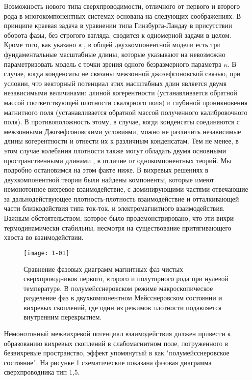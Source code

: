 Возможность нового типа сверхпроводимости, отличного от первого и второго рода 
в многокомпонентных системах \cite{bib:1,bib:2} основана на следующих 
соображениях. В принципе краевая задача в уравнении типа Гинзбурга-Ландау в 
присутствии оборота фазы, без строгого взгляда, сводится к одномерной задачи 
в целом. Кроме того, как указано в \cite{bib:1,bib:2}, в общей 
двухкомпонентной модели есть три фундаментальные масштабные длины, которые 
указывают на невозможно параметризовать модель с точки зрения одного 
безразмерного параметра \( \kappa \). В случае, когда конденсаты не связаны 
межзонной джозефсоновской связью, при условии, что векторный потенциал этих
масштабных длин является двумя независимыми величинами: длиной когерентности 
(устанавливается обратной массой соответствующей плотности скалярного поля) и 
глубиной проникновения магнитного поля (устанавливается обратной массой 
полученного калибровочного поля). В противоположность этому, в случае, когда 
конденсаты соединяются с межзонными Джозефсоновскими условиями, можно не 
различить независимые длины когерентности и отнести их к различным 
конденсатам. Тем не менее, в этом случае колебания плотности также могут 
обладать двумя основными пространственными длинами \cite{bib:2}, в отличие от 
однокомпонентных теорий. Мы подробно остановимся на этом факте ниже. В 
\cite{bib:1,bib:2} вихревых решениях в двухкомпонентной теории были найдены 
компоненты, которые имеют немонотонное вихревое взаимодействие, с 
доминирующими частями отвечающие за дальнодействующее плотность-плотность 
взаимодействие и отталкивающей части близкодействия типа ток-ток, и 
электромагнитного взаимодействия. Важным обстоятельством, которое было 
продемонстрировано, что эти вихри термодинамически стабильны, несмотря на 
существование притягивающего хвоста во взаимодействии.

\begin{figure}[h!]
  \center
  \texttt{[image: 1-01]}
  \caption{Сравнение фазовых диаграмм магнитных фаз чистых сверхпроводников
    первого, второго и полуторного рода при нулевой температуре. В 
    полумейсснеровском режиме макроскопическое разделение фаз в 
    двухкомпонентном Мейсснеровском состоянии и вихревых скоплений, где один 
    из режимов плотности подавляется внутренним перекрытием.}
  \label{fig:1}
\end{figure}

Немонотонный межвихревой потенциал взаимодействия должен привести к 
образованию вихревых скоплений в слабомагнитном поле, погруженного в 
безвихревые пространство, эффект упомянутый в \cite{bib:1} как 
"полумейсснеровское состояние". На рисунке \ref{fig:1} схематические показана 
фазовая диаграмма сверхпроводника тип 1,5.

